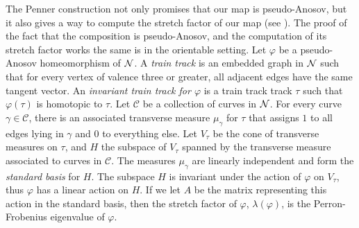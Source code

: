  The Penner construction not only promises that our map is pseudo-Anosov, but it also gives a way to
compute the stretch factor of our map (see \cite{penner1988construction}).  The proof of the fact
that the composition is pseudo-Anosov, and the computation of its stretch factor works the same is
in the orientable setting.  Let $\varphi$ be a pseudo-Anosov homeomorphism of $\mathcal{N}$.  A {\it train track} is an embedded graph in $\mathcal{N}$ such that for every vertex of valence three or greater, all adjacent edges have the same tangent vector.  An {\it invariant train track for $\varphi$} is a train track track $\tau$ such that $\varphi(\tau)$ is homotopic to $\tau$.  Let $\mathcal{C}$ be a collection of curves in $\mathcal{N}$. %
For every curve $\gamma \in\mathcal{C}$, there is an associated transverse measure
$\mu_\gamma$ for $\tau$ that assigns $1$ to all edges lying in $\gamma$ and 0 to everything else. Let $V_\tau$
be the cone of transverse measures on $\tau$, and $H$ the subspace of $V_\tau$ spanned by the
transverse measure associated to curves in $\mathcal{C}$.
The measures $\mu_\gamma$ are linearly independent and form the \textit{standard basis} for $H$. The subspace $H$ is invariant under the action of $\varphi$ on $V_\tau$, thus $\varphi$ has a linear action on $H$. If we let $A$
be the matrix representing this action in the standard basis, then the stretch factor of $\varphi$,
$\lambda(\varphi)$, is the Perron-Frobenius eigenvalue of $\varphi$.

